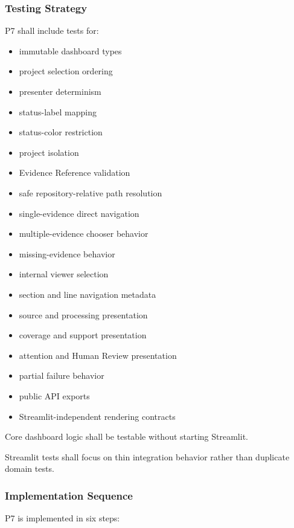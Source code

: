 \hypertarget{testing-strategy}{%
\subsubsection{Testing Strategy}\label{testing-strategy}}

P7 shall include tests for:

\begin{itemize}
\tightlist
\item
  immutable dashboard types
\item
  project selection ordering
\item
  presenter determinism
\item
  status-label mapping
\item
  status-color restriction
\item
  project isolation
\item
  Evidence Reference validation
\item
  safe repository-relative path resolution
\item
  single-evidence direct navigation
\item
  multiple-evidence chooser behavior
\item
  missing-evidence behavior
\item
  internal viewer selection
\item
  section and line navigation metadata
\item
  source and processing presentation
\item
  coverage and support presentation
\item
  attention and Human Review presentation
\item
  partial failure behavior
\item
  public API exports
\item
  Streamlit-independent rendering contracts
\end{itemize}

Core dashboard logic shall be testable without starting Streamlit.

Streamlit tests shall focus on thin integration behavior rather than duplicate domain tests.

\hypertarget{implementation-sequence-1}{%
\subsubsection{Implementation Sequence}\label{implementation-sequence-1}}

P7 is implemented in six steps:


